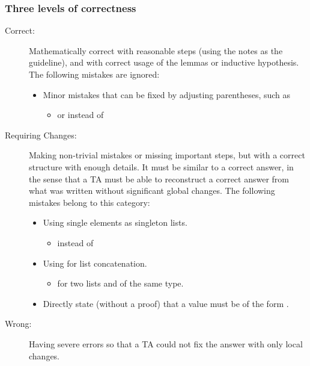 \documentclass[fleqn]{article}
\begin{document}
\subsubsection*{Three levels of correctness}
\begin{description}
  \item[Correct:] Mathematically correct with reasonable steps (using the notes as the guideline), and with correct usage of the lemmas or inductive hypothesis. The following mistakes are ignored:
  \begin{itemize}
    \item Minor mistakes that can be fixed by adjusting parentheses, such as
      \begin{itemize}
        \item {} or  instead of 
      \end{itemize}
  \end{itemize}

  \item[Requiring Changes:]
    Making non-trivial mistakes or missing important steps, but with a correct structure with enough details. It must be similar to a correct answer, in the sense that a TA must be able to reconstruct a correct answer from what was written without significant global changes. The following mistakes belong to this category:
    \begin{itemize}
      \item Using single elements as singleton lists.
        \begin{itemize}
          \item {} instead of 
        \end{itemize}
      \item Using \InlineCode{::} for list concatenation.
        \begin{itemize}
          \item {} for two lists  and  of the same type.
        \end{itemize}
      \item Directly state (without a proof) that a  value must be of the form \InlineCode{[x1; x2; \ldots; x3]}.
    \end{itemize}
  \item[Wrong:] Having severe errors so that a TA could not fix the answer with only local changes.
\end{description}
\end{document}
